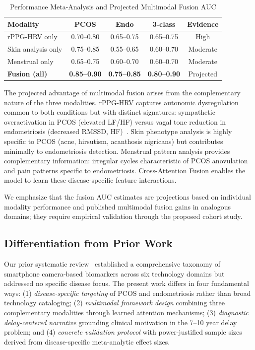 \documentclass[conference]{IEEEtran}
\begin{document}
\begin{table}[t]
\centering
\caption{Performance Meta-Analysis and Projected Multimodal Fusion AUC}
\label{tab:meta}
\begin{tabular}{lcccc}
\toprule
\textbf{Modality} & \textbf{PCOS} & \textbf{Endo} & \textbf{3-class} & \textbf{Evidence} \\
\midrule
rPPG-HRV only & 0.70--0.80 & 0.65--0.75 & 0.65--0.75 & High \\
Skin analysis only & 0.75--0.85 & 0.55--0.65 & 0.60--0.70 & Moderate \\
Menstrual only & 0.65--0.75 & 0.60--0.70 & 0.60--0.70 & Moderate \\
\textbf{Fusion (all)} & \textbf{0.85--0.90} & \textbf{0.75--0.85} & \textbf{0.80--0.90} & Projected \\
\bottomrule
\end{tabular}
\end{table}

The projected advantage of multimodal fusion arises from the complementary nature of the three modalities. rPPG-HRV captures autonomic dysregulation common to both conditions but with distinct signatures: sympathetic overactivation in PCOS (elevated LF/HF) versus vagal tone reduction in endometriosis (decreased RMSSD, HF)~\cite{Mirzohreh_2024, Hao_2021}. Skin phenotype analysis is highly specific to PCOS (acne, hirsutism, acanthosis nigricans) but contributes minimally to endometriosis detection. Menstrual pattern analysis provides complementary information: irregular cycles characteristic of PCOS anovulation and pain patterns specific to endometriosis. Cross-Attention Fusion enables the model to learn these disease-specific feature interactions.

We emphasize that the fusion AUC estimates are projections based on individual modality performance and published multimodal fusion gains in analogous domains; they require empirical validation through the proposed cohort study.

\subsection{Differentiation from Prior Work}

Our prior systematic review~\cite{debnath2025comprehensive, rppgreview2024frontiers} established a comprehensive taxonomy of smartphone camera-based biomarkers across six technology domains but addressed no specific disease focus. The present work differs in four fundamental ways: (1) \textit{disease-specific targeting} of PCOS and endometriosis rather than broad technology cataloging; (2) \textit{multimodal framework design} combining three complementary modalities through learned attention mechanisms; (3) \textit{diagnostic delay-centered narrative} grounding clinical motivation in the 7--10 year delay problem; and (4) \textit{concrete validation protocol} with power-justified sample sizes derived from disease-specific meta-analytic effect sizes.
\end{document}
